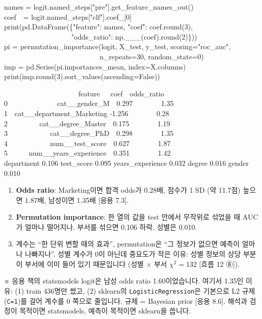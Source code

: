 \documentclass[11pt,a4paper]{article}
\newcommand{\code}[1]{\texttt{#1}}
\newcommand{\aside}[1]{{\footnotesize\color{black!65}#1}}
\begin{document}
\begin{codebox}
names = logit.named\_steps["pre"].get\_feature\_names\_out()\\
coef\ \ = logit.named\_steps["clf"].coef\_[0]\\
print(pd.DataFrame(\{"feature": names, "coef": coef.round(3),\\
\ \ \ \ \ \ \ \ \ \ \ \ \ \ \ \ \ \ \ "odds\_ratio": np.\_\_\_(coef).round(2)\}))\\[3pt]
pi = permutation\_importance(logit, X\_test, y\_test, scoring="roc\_auc",\\
\ \ \ \ \ \ \ \ \ \ \ \ \ \ \ \ \ \ \ \ \ \ \ \ \ \ \ n\_repeats=30, random\_state=0)\\
imp = pd.Series(pi.importances\_mean, index=X.columns)\\
print(imp.round(3).sort\_values(ascending=False))
\end{codebox}
\begin{outbox}
\ \ \ \ \ \ \ \ \ \ \ \ \ \ \ \ \ \ \ \ \ feature\ \ \ coef\ \ odds\_ratio\\
0\ \ \ \ \ \ \ \ \ \ \ \ \ \ cat\_\_gender\_M\ \ 0.297\ \ \ \ \ \ \ \ 1.35\\
1\ \ cat\_\_department\_Marketing -1.256\ \ \ \ \ \ \ \ 0.28\\
2\ \ \ \ \ \ \ \ \ cat\_\_degree\_Master\ \ 0.175\ \ \ \ \ \ \ \ 1.19\\
3\ \ \ \ \ \ \ \ \ \ \ \ cat\_\_degree\_PhD\ \ 0.298\ \ \ \ \ \ \ \ 1.35\\
4\ \ \ \ \ \ \ \ \ \ \ \ num\_\_test\_score\ \ 0.627\ \ \ \ \ \ \ \ 1.87\\
5\ \ \ \ \ \ num\_\_years\_experience\ \ 0.351\ \ \ \ \ \ \ \ 1.42\\[3pt]
department 0.106 \quad test\_score 0.095 \quad years\_experience 0.032 \quad degree 0.016 \quad gender 0.010
\end{outbox}

\begin{howbox}
\begin{enumerate}
\item \textbf{Odds ratio}: Marketing이면 합격 odds가 0.28배, 점수가 1 SD (약 11.7점) 높으면 1.87배, 남성이면 1.35배 [응용 7.3].
\item \textbf{Permutation importance}: 한 열의 값을 test 안에서 무작위로 섞었을 때 AUC가 얼마나 떨어지나. 부서를 섞으면 0.106 하락, 성별은 0.010.
\item 계수는 ``한 단위 변할 때의 효과'', permutation은 ``그 정보가 없으면 예측이 얼마나 나빠지나''. 성별 계수가 0이 아닌데 중요도가 작은 이유: 성별 정보의 상당 부분이 부서에 이미 들어 있기 때문입니다 (성별 $\times$ 부서 $\chi^2=132$ [흐름 12 ⑧]).
\end{enumerate}
\end{howbox}
\aside{※ 응용 책의 statsmodels logit은 남성 odds ratio 1.60이었습니다. 여기서 1.35인 이유: (1) train 436명만 썼고, (2) sklearn의 \code{LogisticRegression}은 기본으로 L2 규제(\code{C=1})를 걸어 계수를 0 쪽으로 줄입니다. 규제 = Bayesian prior [응용 8.6]. 해석과 검정이 목적이면 statsmodels, 예측이 목적이면 sklearn을 씁니다.}
\end{document}

